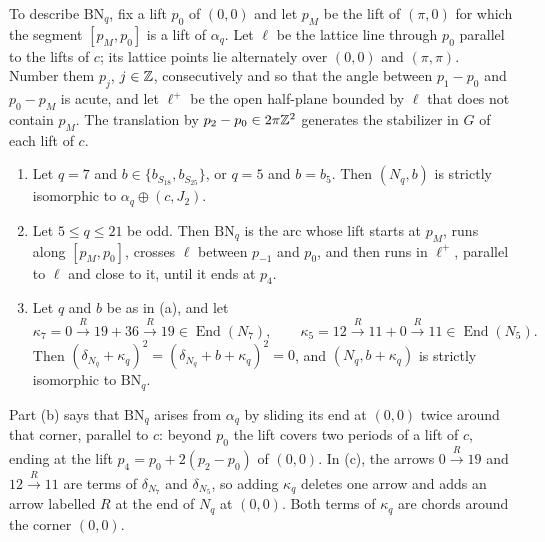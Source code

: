 To describe $\mathrm{BN}_q$, fix a lift $p_0$ of $(0,0)$ and let $p_M$ be the lift of $(\pi,0)$ for
which the segment $[p_M,p_0]$ is a lift of $\alpha_q$.  Let $\ell$ be the lattice line through $p_0$
parallel to the lifts of $c$; its lattice points lie alternately over $(0,0)$ and $(\pi,\pi)$.  Number them $p_j$,
$j\in\mathbb{Z}$, consecutively and so that the angle between $p_1-p_0$ and $p_0-p_M$ is acute, and let
$\ell^+$ be the open half-plane bounded by $\ell$ that does not contain $p_M$.  The translation by
$p_2-p_0\in2\pi\mathbb{Z}^2$ generates the stabilizer in $G$ of each lift of $c$.

\begin{theorem}\label{thm:structure-full}
\begin{enumerate}
\item[(a)] Let $q=7$ and $b\in\{b_{S_{18}},b_{S_{25}}\}$, or $q=5$ and $b=b_5$.  Then $(N_q,b)$ is
 strictly isomorphic to $\alpha_q\oplus(c,J_2)$.
\item[(b)] Let $5\le q\le21$ be odd.  Then $\mathrm{BN}_q$ is the arc whose lift starts at $p_M$, runs
 along $[p_M,p_0]$, crosses $\ell$ between $p_{-1}$ and $p_0$, and then runs in $\ell^+$, parallel to
 $\ell$ and close to it, until it ends at $p_4$.
\item[(c)] Let $q$ and $b$ be as in (a), and let
 \[
  \kappa_7=0\xrightarrow R19+36\xrightarrow R19\in\operatorname{End}(N_7),\qquad
  \kappa_5=12\xrightarrow R11+0\xrightarrow R11\in\operatorname{End}(N_5).
 \]
 Then $(\delta_{N_q}+\kappa_q)^2=(\delta_{N_q}+b+\kappa_q)^2=0$, and $(N_q,b+\kappa_q)$ is strictly
 isomorphic to $\mathrm{BN}_q$.
\end{enumerate}
\end{theorem}

Part (b) says that $\mathrm{BN}_q$ arises from $\alpha_q$ by sliding its end at $(0,0)$ twice around
that corner, parallel to $c$: beyond $p_0$ the lift covers two periods of a lift of $c$, ending at
the lift $p_4=p_0+2(p_2-p_0)$ of $(0,0)$.  In (c), the arrows $0\xrightarrow R19$ and
$12\xrightarrow R11$ are terms of $\delta_{N_7}$ and $\delta_{N_5}$, so adding $\kappa_q$ deletes one
arrow and adds an arrow labelled $R$ at the end of $N_q$ at $(0,0)$.  Both terms of $\kappa_q$ are
chords around the corner $(0,0)$.

